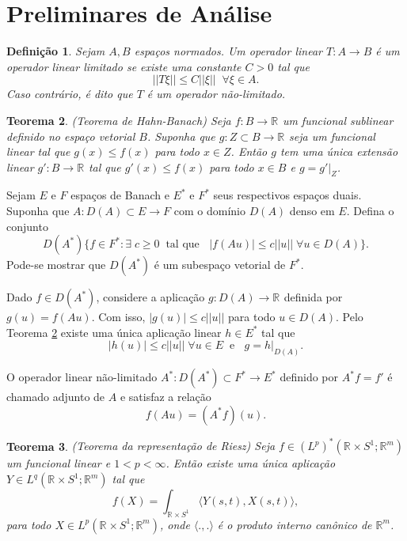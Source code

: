 \documentclass[12pt]{book}
\newtheorem{teorema}{Teorema}[section]
\newtheorem{definicao}[teorema]{Definição}
\newcommand{\circulo}{S^{1}}
\newcommand{\espacoLpcontradominio}[2]{L^{p}(#1;#2)}
\newcommand{\espacoLpadjuntoretacirculo}{L^{q}(\retacartesianocirculo;\real{m})}
\newcommand{\espacoLpdual}{(L^{p})^{*}(\retacartesianocirculo;\real{m})}
\newcommand{\norma}[1]{||#1||}
\newcommand{\produtointerno}[2]{\langle #1, #2 \rangle}
\newcommand{\retacartesianocirculo}{\real{} \times \circulo}
\newcommand{\real}[1]{\mathbb{R}^{#1}}
\newcommand{\reta}{\real{}}
\begin{document}
	\section{Preliminares de Análise}\label{apendice_preliminares_analise}
	\begin{definicao}
		Sejam $A,B$ espaços normados. Um operador linear $T:A\to B$ é um operador linear limitado se existe uma constante $C>0$ tal que
		$$
		\norma{T\xi} \leq C\norma{\xi}\;\;\forall \xi \in A.
		$$
		Caso contrário, é dito que $T$ é um operador não-limitado.
	\end{definicao}
	
	\begin{teorema}\label{teorema_hahn_banach}
		(Teorema de Hahn-Banach) Seja $f:B \to \reta$ um funcional sublinear definido no espaço vetorial $B$. Suponha que $g:Z \subset B \to \reta$ seja um funcional linear tal que $g(x)\leq f(x)$ para todo $x \in Z$. Então $g$ tem uma única extensão linear $g': B \to \reta$ tal que $g'(x)\leq f(x)$ para todo $x \in B$ e $g=g'|_{Z}$.
	\end{teorema}
	
	Sejam $E$ e $F$ espaços de Banach e $E^{*}$ e $F^{*}$ seus respectivos espaços duais. Suponha que $A: D(A)\subset E\to F$ com o domínio $D(A)$ denso em $E$. Defina o conjunto 
	$$
	D(A^{*})\{ f\in F^{*}: \exists\;c\geq 0\;\;\text{tal que }\;\; |f(Au)|\leq c\norma{u}\;\forall u\in D(A)\}.
	$$
	Pode-se mostrar que $D(A^{*})$ é um subespaço vetorial de $F^{*}$.
	
	Dado $f\in D(A^{*})$, considere a aplicação $g:D(A)\to \reta$ definida por $g(u) = f(Au)$. Com isso, $|g(u)|\leq c\norma{u}$ para todo $u\in D(A)$. Pelo Teorema \ref{teorema_hahn_banach} existe uma única aplicação linear $h\in E^{*}$ tal que 
	$$
	|h(u)|\leq c\norma{u} \;\forall u \in E \;\;\text{e }\;\; g=h|_{D(A)}.
	$$
	
	O operador linear não-limitado $A^{*}:D(A^{*})\subset F^{*}\to E^{*}$ definido por $A^{*}f=f'$ é chamado adjunto de $A$ e satisfaz a relação
	$$
	f(Au) = (A^{*}f)(u).
	$$
	
	\begin{teorema}\label{teorema_representacao_reiz}
		(Teorema da representação de Riesz) Seja $f \in \espacoLpdual$ um funcional linear e $1<p<\infty$. Então existe uma única aplicação $Y \in \espacoLpadjuntoretacirculo$ tal que
		$$
		f(X) = \int_{\retacartesianocirculo}\produtointerno{Y(s,t)}{X(s,t)},
		$$
		para todo $X \in \espacoLpcontradominio{\retacartesianocirculo}{\real{m}}$, onde $\produtointerno{.}{.}$ é o produto interno canônico de $\real{m}$.
	\end{teorema}
	
\end{document}
